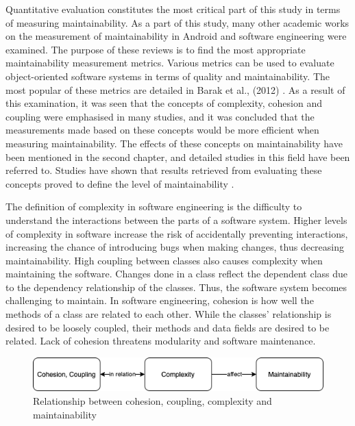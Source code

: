 Quantitative evaluation constitutes the most critical part of this study in terms of measuring maintainability. As a part of this study, many other academic works on the measurement of maintainability in Android and software engineering were examined. The purpose of these reviews is to find the most appropriate maintainability measurement metrics. Various metrics can be used to evaluate object-oriented software systems in terms of quality and maintainability. The most popular of these metrics are detailed in Barak et al., (2012) \cite{33}. As a result of this examination, it was seen that the concepts of complexity, cohesion and coupling were emphasised in many studies, and it was concluded that the measurements made based on these concepts would be more efficient when measuring maintainability. The effects of these concepts on maintainability have been mentioned in the second chapter, and detailed studies in this field have been referred to. Studies have shown that results retrieved from evaluating these concepts proved to define the level of maintainability \cite{33}.

The definition of complexity in software engineering is the difficulty to understand the interactions between the parts of a software system. Higher levels of complexity in software increase the risk of accidentally preventing interactions, increasing the chance of introducing bugs when making changes, thus decreasing maintainability. High coupling between classes also causes complexity when maintaining the software. Changes done in a class reflect the dependent class due to the dependency relationship of the classes. Thus, the software system becomes challenging to maintain. In software engineering, cohesion is how well the methods of a class are related to each other. While the classes' relationship is desired to be loosely coupled, their methods and data fields are desired to be related. Lack of cohesion threatens modularity and software maintenance. 
\begin{figure}[ht!]
    \centering
    \includegraphics[scale=0.5]{figures/maintainability_factors.png}
    \caption{Relationship between cohesion, coupling, complexity and maintainability \protect\cite{33}}
    \label{fig:maintainability_factors}
\end{figure}

